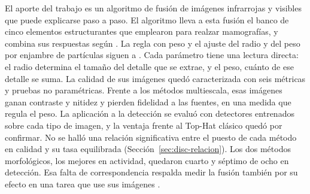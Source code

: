 El aporte del trabajo es un algoritmo de fusión de imágenes infrarrojas y visibles que puede explicarse
paso a paso. El algoritmo lleva a esta fusión el banco de cinco elementos estructurantes que
\textcite{floressf} emplearon para realzar mamografías, y combina sus respuestas según
\textcite{bala2024}. La regla con peso y el ajuste del radio y del peso por enjambre de partículas
siguen a \textcite{ortegarodriguez2025}. Cada parámetro tiene una lectura directa: el radio determina el
tamaño del detalle que se extrae, y el peso, cuánto de ese detalle se suma. La calidad de sus imágenes
quedó caracterizada con seis métricas y pruebas no paramétricas. Frente a los métodos multiescala, esas
imágenes ganan contraste y nitidez y pierden fidelidad a las fuentes, en una medida que regula el peso.
La aplicación a la detección se evaluó con detectores entrenados sobre cada tipo de imagen, y la ventaja
frente al Top-Hat clásico quedó por confirmar. No se halló una relación significativa entre el puesto
de cada método en calidad y su tasa equilibrada (Sección~\ref{sec:disc-relacion}). Los dos métodos
morfológicos, los mejores en actividad, quedaron cuarto y séptimo de ocho en detección. Esa
falta de correspondencia respalda medir la fusión también por su efecto en una tarea que use sus
imágenes \parencite{liu2022, tang2022}.
